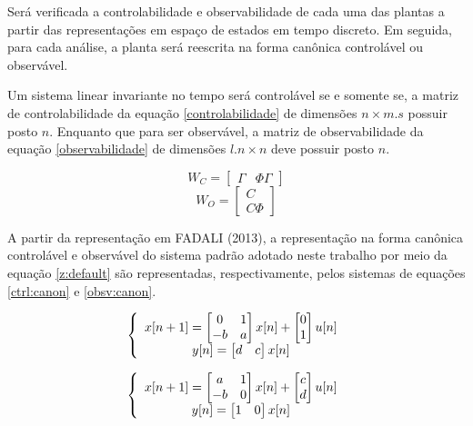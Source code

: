 Será verificada a controlabilidade e observabilidade de cada uma das plantas a partir das representações em espaço de estados em tempo discreto. Em seguida, para cada análise, a planta será reescrita na forma canônica controlável ou observável.

Um sistema linear invariante no tempo será controlável se e somente se, a matriz de controlabilidade da equação \ref{controlabilidade} de dimensões $n \times m.s$ possuir posto $n$. Enquanto que para ser observável, a matriz de observabilidade da equação \ref{observabilidade} de dimensões $l.n \times n$ deve possuir posto $n$.

\begin{equation} \label{controlabilidade}
    W_C = \begin{bmatrix} \Gamma & \Phi \Gamma \end{bmatrix}
\end{equation}
\begin{equation} \label{observabilidade}
    W_O = \begin{bmatrix} C \\ C \Phi \end{bmatrix}
\end{equation}

A partir da representação em FADALI (2013), a representação na forma canônica controlável e observável do sistema padrão adotado neste trabalho por meio da equação \ref{z:default} são representadas, respectivamente, pelos sistemas de equações \ref{ctrl:canon} e \ref{obsv:canon}.

\begin{equation} \label{ctrl:canon}
\centering
\left \{
\begin{array}{cc}
x[n+1] = \begin{bmatrix} 0 & 1 \\ -b & a \end{bmatrix} x[n] + \begin{bmatrix} 0 \\ 1 \end{bmatrix} u[n] \\
y[n] = \begin{bmatrix} d & c  \end{bmatrix} x[n] \\
\end{array}
\right.
\end{equation}

\begin{equation} \label{obsv:canon}
\centering
\left \{
\begin{array}{cc}
x[n+1] = \begin{bmatrix} a & 1 \\ -b & 0 \end{bmatrix} x[n] + \begin{bmatrix} c \\ d \end{bmatrix} u[n] \\
y[n] = \begin{bmatrix} 1 & 0  \end{bmatrix} x[n] \\
\end{array}
\right.
\end{equation}

